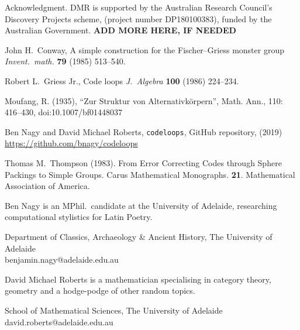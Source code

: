 \documentclass{article}
\theoremstyle{plain}
\theoremstyle{definition}
\newtheorem*{definition}{Definition}
\newtheorem*{remark}{Remark}
\begin{document}



\begin{acknowledgment}{Acknowledgment.}
DMR is supported by the Australian Research Council's Discovery Projects scheme, (project number DP180100383), funded by the Australian Government. \textbf{ADD MORE HERE, IF NEEDED}
\end{acknowledgment}

\begin{thebibliography}{1}

 John H.\ Conway, A simple construction for the Fischer--Griess monster group \emph{Invent.\ math.} \textbf{79} (1985) 513--540.

 Robert L.\ Griess Jr., Code loops \emph{J.\ Algebra} \textbf{100} (1986) 224--234.

 Moufang, R. (1935), ``Zur Struktur von Alternativk\"orpern'', Math. Ann., 110: 416–430, doi:10.1007/bf01448037

 Ben Nagy and David Michael Roberts, \texttt{codeloops}, GitHub repository, (2019) \url{https://github.com/bnagy/codeloops}

 Thomas M.\ Thompson (1983). From Error Correcting Codes through Sphere Packings to Simple Groups. Carus Mathematical Monographs. \textbf{21}. Mathematical Association of America. 

\end{thebibliography}

\begin{biog}
\item[Ben Nagy] is an MPhil.\ candidate at the University of Adelaide, researching computational stylistics for Latin Poetry.
\begin{affil}
Department of Classics, Archaeology \& Ancient History, The University of Adelaide\\
benjamin.nagy@adelaide.edu.au
\end{affil}

\item[David Michael Roberts] is a mathematician specialising in category theory, geometry and a hodge-podge of other random topics.
\begin{affil}
School of Mathematical Sciences, The University of Adelaide\\
david.roberts@adelaide.edu.au
\end{affil}
\end{biog}
\vfill\eject
\end{document}

